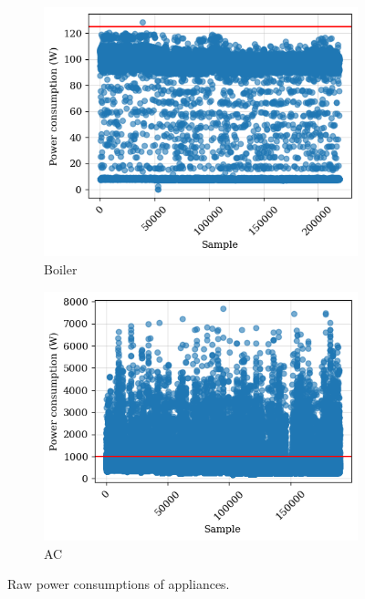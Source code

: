 \begin{figure}
\begin{subfigure}{.5\textwidth}
      \includegraphics[width=.9\linewidth]{images/raw_consumptions/boiler.png}
      \caption{Boiler}
      \label{fig:boiler}
    \end{subfigure}%
    \begin{subfigure}{.5\textwidth}
      \centering
      \includegraphics[width=.9\linewidth]{images/raw_consumptions/ac.png}
      \caption{AC}
      \label{fig:ac}
    \end{subfigure}
\caption{Raw power consumptions of appliances.}
\label{fig:raw_power_consumptions}
\end{figure}

